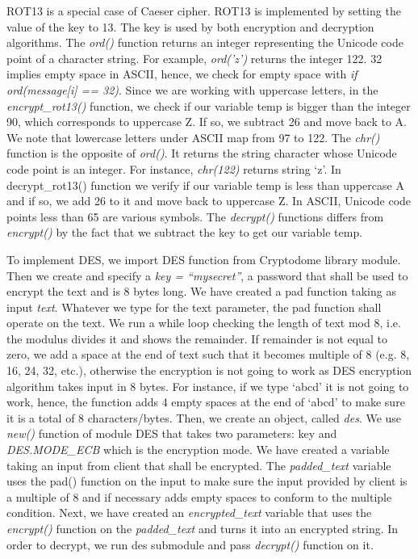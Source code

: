 ROT13 is a special case of Caeser cipher. ROT13 is implemented by setting the value of the key to 13. The key is used by both encryption and decryption algorithms. The \textit{ord()} function returns an integer representing the Unicode code point of a character string. For example, \textit{ord('z')} returns the integer 122. 32 implies empty space in ASCII, hence, we check for empty space with \textit{if ord(message[i] == 32)}. Since we are working with uppercase letters, in the \textit{encrypt\_rot13()} function, we check if our variable temp is bigger than the integer 90, which corresponds to uppercase Z. If so, we subtract 26 and move back to A. We note that lowercase letters under ASCII map from 97 to 122. The \textit{chr()} function is the opposite of \textit{ord()}. It returns the string character whose Unicode code point is an integer. For instance, \textit{chr(122)} returns string ‘z’. In decrypt\_rot13() function we verify if our variable temp is less than uppercase A and if so, we add 26 to it and move back to uppercase Z. In ASCII, Unicode code points less than 65 are various symbols. The \textit{decrypt()} functions differs from \textit{encrypt()} by the fact that we subtract the key to get our variable temp. 

To implement DES, we import DES function from Cryptodome library module. Then we create and specify a \textit{key = “mysecret”}, a password that shall be used to encrypt the text and is 8 bytes long. We have created a pad function taking as input \textit{text}. Whatever we type for the text parameter, the pad function shall operate on the text. We run a while loop checking the length of text mod 8, i.e. the modulus divides it and shows the remainder. If remainder is not equal to zero, we add a space at the end of text such that it becomes multiple of 8 (e.g. 8, 16, 24, 32, etc.), otherwise the encryption is not going to work as DES encryption algorithm takes input in 8 bytes. For instance, if we type ‘abcd’ it is not going to work, hence, the function adds 4 empty spaces at the end of ‘abcd’ to make sure it is a total of 8 characters/bytes. Then, we create an object, called \textit{des}. We use \textit{new()} function of module DES that takes two parameters: key and \textit{DES.MODE\_ECB} which is the encryption mode. We have created a variable taking an input from client that shall be encrypted. The \textit{padded\_text} variable uses the pad() function on the input to make sure the input provided by client is a multiple of 8 and if necessary adds empty spaces to conform to the multiple condition. Next, we have created an \textit{encrypted\_text} variable that uses the \textit{encrypt()} function on the \textit{padded\_text} and turns it into an encrypted string. In order to decrypt, we run des submodule and pass \textit{decrypt()} function on it. 

